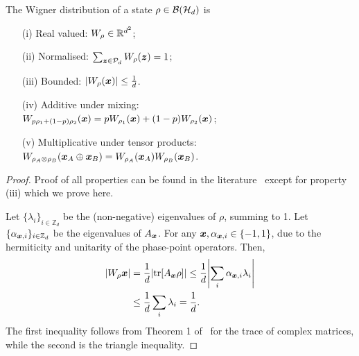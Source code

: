 \begin{proposition}\label{thm:wstate}
  The Wigner distribution of a state $\rho \in \cal{B}(\cal{H}_d)$ is
  \begin{enumerate}
    \item[(i)]\label{en:w1} Real valued: $\W{\rho} \in \mathbb{R}^{d^2}$;
    \item[(ii)]\label{en:w2} Normalised: $\sum_{\bmz \in \cal{P}_d} \W[\bmz]{\rho}=1$;
    \item[(iii)]\label{en:w3} Bounded: $\abs{\W[\bmx]{\rho}} \leq \frac{1}{d}$.
    \item[(iv)]\label{en:w4} Additive under mixing: \vspace{2pt}\\
    $\W[\bmx]{p\rho_1 + (1-p)\rho_2} = p\W[\bmx]{\rho_1} + (1-p)\W[\bmx]{\rho_2}$;
    \item[(v)]\label{en:w5} Multiplicative under tensor products: \vspace{2pt}\\
    $\W[\bmx_A \oplus \bmx_B]{\rho_A \otimes \rho_B} = \W[\bmx_A]{\rho_A}\W[\bmx_B]{\rho_B}$.
	\end{enumerate}
\end{proposition}
\begin{proof}
	Proof of all properties can be found in the literature~\cite{cit:veitch,Vourdas_2004,cit:gross3,Wang_2019} except for property (iii) which we prove here.
	
Let $\{\lambda_i\}_{i \in \mathbb{Z}_d}$ be the (non-negative) eigenvalues of $\rho$, summing to 1.
Let $\{\alpha_{\bmx,i}\}_{i \in \mathbb{Z}_d}$ be the eigenvalues of $A_{\bmx}$. For any $\bmx, \alpha_{\bmx,i} \in \{-1, 1\}$, due to the hermiticity and unitarity of the phase-point operators. 
Then,
\begin{align}
	\abs{\W{\rho}{\bmx}} &= \frac{1}{d}\abs{\tr[A_{\bmx} \rho]} \leq \frac{1}{d} \abs{\sum_i \alpha_{\bmx,i} \lambda_i} \nonumber\\ &\leq \frac{1}{d}\sum_i \lambda_i = \frac{1}{d}.
\end{align}
The first inequality follows from Theorem 1 of~\cite{cit:mirsky} for the trace of complex matrices, while the second is the triangle inequality.
\end{proof}


